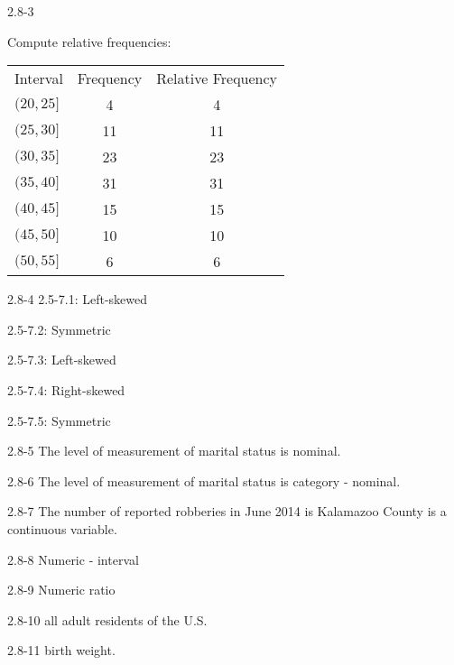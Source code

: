\begin{exsol@solution}{2.8-3}

Compute relative frequencies:

\begin{tabular}{@{} lcc @{}} \hline
Interval  &  Frequency &	Relative Frequency \\
$(20, 25]$ 	&     4 & 4  \\
$(25, 30]$ 	&    11 & 11 \\
$(30, 35]$ 	&    23 & 23 \\
$(35, 40]$ 	&    31 & 31 \\
$(40, 45]$ 	&    15 & 15 \\
$(45, 50]$ 	&    10 & 10 \\
$(50, 55]$ 	&     6 & 6 \\ \hline
\end{tabular}


\end{exsol@solution}
\begin{exsol@solution}{2.8-4}
2.5-7.1: Left-skewed

2.5-7.2: Symmetric

2.5-7.3: Left-skewed

2.5-7.4: Right-skewed

2.5-7.5: Symmetric

\end{exsol@solution}
\begin{exsol@solution}{2.8-5}
	  The level of measurement of marital status is nominal.
\end{exsol@solution}
\begin{exsol@solution}{2.8-6}
	  The level of measurement of marital status is category - nominal.
\end{exsol@solution}
\begin{exsol@solution}{2.8-7}
	  The number of reported robberies in June 2014 is Kalamazoo County is a continuous variable.
\end{exsol@solution}
\begin{exsol@solution}{2.8-8}
    Numeric - interval

\end{exsol@solution}
\begin{exsol@solution}{2.8-9}
    Numeric  ratio

\end{exsol@solution}
\begin{exsol@solution}{2.8-10}
    all adult residents of the U.S.
\end{exsol@solution}
\begin{exsol@solution}{2.8-11}
    birth weight.
\end{exsol@solution}
